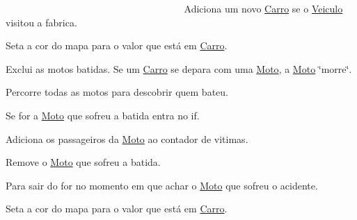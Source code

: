 ~\newline
~\newline
~\newline
~\newline
~\newline
~\newline
~\newline
~\newline
~\newline
~\newline
~\newline
~\newline
~\newline
~\newline
~\newline
~\newline
~\newline
~\newline
~\newline
~\newline
~\newline
~\newline
 Adiciona um novo \mbox{\hyperlink{class_carro}{Carro}} se o \mbox{\hyperlink{class_veiculo}{Veiculo}} visitou a fabrica.

Seta a cor do mapa para o valor que está em \mbox{\hyperlink{class_carro}{Carro}}.

Exclui as motos batidas. Se um \mbox{\hyperlink{class_carro}{Carro}} se depara com uma \mbox{\hyperlink{class_moto}{Moto}}, a \mbox{\hyperlink{class_moto}{Moto}} \char`\"{}morre\char`\"{}.

Percorre todas as motos para descobrir quem bateu.

Se for a \mbox{\hyperlink{class_moto}{Moto}} que sofreu a batida entra no if.

Adiciona os passageiros da \mbox{\hyperlink{class_moto}{Moto}} ao contador de vitimas.

Remove o \mbox{\hyperlink{class_moto}{Moto}} que sofreu a batida.

Para sair do for no momento em que achar o \mbox{\hyperlink{class_moto}{Moto}} que sofreu o acidente.

Seta a cor do mapa para o valor que está em \mbox{\hyperlink{class_carro}{Carro}}.

